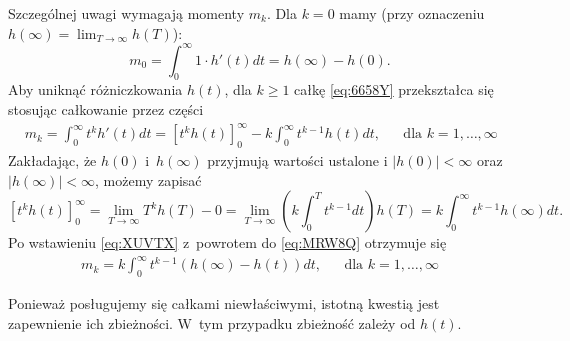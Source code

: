 \documentclass[paper=a4,DIV=12]{lpas}
\begin{document}
\begin{appendices}
  Szczególnej uwagi wymagają momenty $m_k$. Dla $k=0$ mamy (przy oznaczeniu
  $h(\infty) = \lim_{T\to\infty}h(T)$):
  \begin{equation}
    m_0 = \int_0^{\infty} 1 \cdot h'(t) dt = h(\infty) - h(0).
    \label{eq:6V264}
  \end{equation}
  Aby uniknąć różniczkowania $h(t)$, dla $k \ge 1$ całkę \eqref{eq:6658Y}
  przekształca się stosując całkowanie przez części
  \begin{equation}
    \begin{aligned}
      & m_k = \int_0^{\infty} {t^k h'(t) dt}
            = \left[t^k h(t)\right]_0^{\infty} - k \int_0^{\infty}{t^{k-1} h(t) dt}, &
      & \text{dla } k=1, \dots, \infty &
    \end{aligned}
    \label{eq:MRW8Q}
  \end{equation}
  Zakładając, że $h(0)$ i~$h(\infty)$ przyjmują wartości ustalone i $|h(0)| <
  \infty$ oraz $|h(\infty)| < \infty$, możemy zapisać
  \begin{equation}
    \left[t^k h(t)\right]_0^{\infty}
      = \lim_{T\to\infty} T^k h(T) - 0
      = \lim_{T\to\infty}{\left(k \int_0^T t^{k-1} dt\right) h(T)}
      = k \int_0^{\infty}{t^{k-1} h(\infty) dt}.
    \label{eq:XUVTX}
  \end{equation}
  Po wstawieniu \eqref{eq:XUVTX} z~powrotem do \eqref{eq:MRW8Q} otrzymuje się
  \begin{equation}
    \begin{aligned}
      & m_k = k \int_0^{\infty}{t^{k-1} (h(\infty) - h(t)) dt}, &
      & \text{dla } k=1,\dots, \infty &
    \end{aligned}
    \label{eq:CNY34}
  \end{equation}

  Ponieważ posługujemy się całkami niewłaściwymi, istotną kwestią jest
  zapewnienie ich zbieżności. W~tym przypadku zbieżność zależy od $h(t)$.


\end{appendices}
\end{document}
